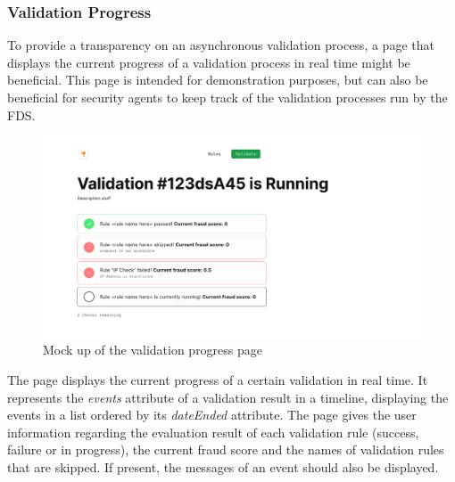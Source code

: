 \subsubsection{Validation Progress}

To provide a transparency on an asynchronous validation process, a page that displays the current progress of a validation process in real time might be beneficial. This page is intended for demonstration purposes, but can also be beneficial for security agents to keep track of the validation processes run by the FDS.

\begin{figure}[!h]
 \includegraphics[width=\textwidth]{diagrams/mockup_validation_progress.png}
 \caption{Mock up of the validation progress page}
\end{figure}

The page displays the current progress of a certain validation in real time. It represents the \emph{events} attribute of a validation result in a timeline, displaying the events in a list ordered by its \emph{dateEnded} attribute. The page gives the user information regarding the evaluation result of each validation rule (success, failure or in progress), the current fraud score and the names of validation rules that are skipped. If present, the messages of an event should also be displayed. 